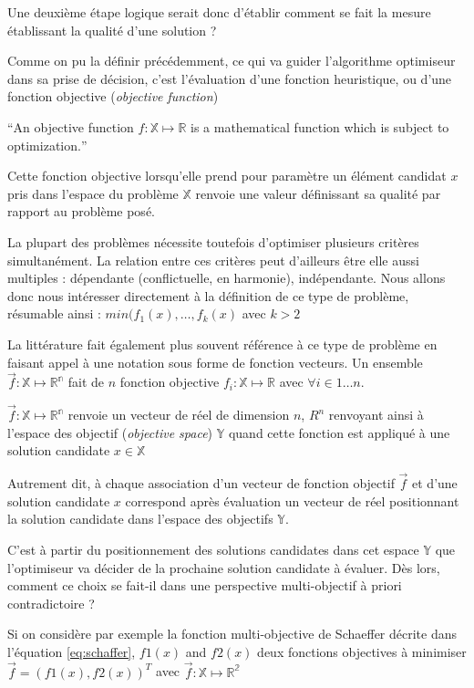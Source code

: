 Une deuxième étape logique serait donc d'établir comment se fait la mesure établissant la qualité d'une solution ? 

Comme on pu la définir précédemment, ce qui va guider l'algorithme optimiseur dans sa prise de décision, c'est l'évaluation d'une fonction heuristique, ou d'une fonction objective (\textit{objective function})  

\foreignquote{english}{An objective function $f: \mathbb{X} \mapsto \mathbb{R}$ is a mathematical function which is subject to optimization.}

Cette fonction objective lorsqu'elle prend pour paramètre un élément candidat $x$ pris dans l'espace du problème $ \mathbb{X}$ renvoie une valeur définissant sa qualité par rapport au problème posé. \autocite[44]{Weise2011}

La plupart des problèmes nécessite toutefois d'optimiser plusieurs critères simultanément. La relation entre ces critères peut d'ailleurs être elle aussi multiples : dépendante (conflictuelle, en harmonie), indépendante. Nous allons donc nous intéresser directement à la définition de ce type de problème, résumable ainsi : $min(f_1(x),\dotsc, f_k(x)$ avec $k > 2$

La littérature fait également plus souvent référence à ce type de problème en faisant appel à une notation sous forme de fonction vecteurs. Un ensemble $\vec{f} : \mathbb{X} \mapsto \mathbb{R^n}$ fait de $n$ fonction objective $f_i : \mathbb{X} \mapsto \mathbb{R}$ avec $\forall i \in 1 \dotsc n$. 

$\vec{f} : \mathbb{X} \mapsto \mathbb{R^n}$ renvoie un vecteur de réel de dimension $n$, $R^n$ renvoyant ainsi à l'espace des objectif (\textit{objective space}) $\mathbb{Y}$ quand cette fonction est appliqué à une solution candidate $x \in \mathbb{X}$ 

Autrement dit, à chaque association d'un vecteur de fonction objectif $\vec{f}$ et d'une solution candidate $x$ correspond après évaluation un vecteur de réel positionnant la solution candidate dans l'espace des objectifs $\mathbb{Y}$.

C'est à partir du positionnement des solutions candidates dans cet espace $\mathbb{Y}$ que l'optimiseur va décider de la prochaine solution candidate à évaluer. Dès lors, comment ce choix se fait-il dans une perspective multi-objectif à priori contradictoire ?

Si on considère par exemple la fonction multi-objective de Schaeffer décrite dans l'équation \ref{eq:schaffer}, $f1(x)$ and $f2(x)$ deux fonctions objectives à minimiser $ \vec{f} = (f1(x),f2(x))^T$  avec $\vec{f}: \mathbb{X} \mapsto \mathbb{R^2}$

